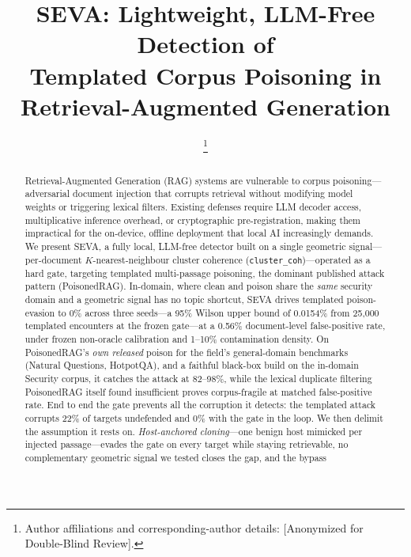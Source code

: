 \documentclass[10pt,journal,compsoc]{IEEEtran}
\begin{document}
\title{SEVA: Lightweight, LLM-Free Detection of\\
Templated Corpus Poisoning in\\
Retrieval-Augmented Generation}

\author{
%
\thanks{Author affiliations and corresponding-author details: [Anonymized for Double-Blind Review].}}

\maketitle

\begin{abstract}
Retrieval-Augmented Generation (RAG) systems are vulnerable to corpus
poisoning---adversarial document injection that corrupts retrieval without
modifying model weights or triggering lexical filters. Existing defenses
require LLM decoder access, multiplicative inference overhead, or cryptographic
pre-registration, making them impractical for the on-device, offline deployment
that local AI increasingly demands. We present SEVA, a fully local, LLM-free
detector built on a single geometric signal---per-document $K$-nearest-neighbour
cluster coherence (\texttt{cluster\_coh})---operated as a hard gate, targeting
templated multi-passage poisoning, the dominant published attack pattern
(PoisonedRAG). In-domain, where clean and poison share the \emph{same} security domain
and a geometric signal has no topic shortcut, SEVA drives templated poison-evasion to
0\% across three seeds---a 95\% Wilson upper bound of 0.0154\% from 25{,}000 templated
encounters at the frozen gate---at a 0.56\% document-level false-positive rate, under
frozen non-oracle calibration and 1--10\% contamination density. On PoisonedRAG's
\emph{own released} poison for the field's general-domain benchmarks (Natural Questions,
HotpotQA), and a faithful black-box build on the in-domain Security corpus, it catches
the attack at 82--98\%, while the lexical duplicate filtering PoisonedRAG itself found
insufficient proves corpus-fragile at matched false-positive rate. End to end the gate prevents
all the corruption it detects: the templated attack corrupts 22\% of targets undefended and 0\%
with the gate in the loop. We then delimit the assumption it rests on. \emph{Host-anchored
cloning}---one benign host mimicked per injected passage---evades the gate on every target while
staying retrievable, no complementary geometric signal we tested closes the gap, and the bypass

\end{abstract}
\end{document}
